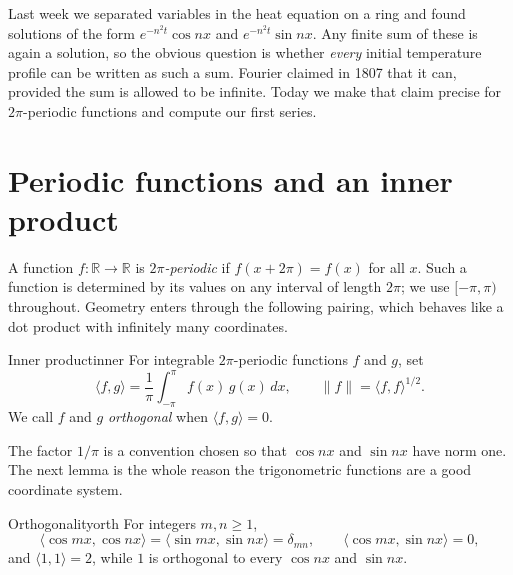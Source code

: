 \documentclass[11pt]{article}
\begin{document}

Last week we separated variables in the heat equation on a ring and found
solutions of the form $e^{-n^2 t}\cos nx$ and $e^{-n^2 t}\sin nx$. Any finite
sum of these is again a solution, so the obvious question is whether
\emph{every} initial temperature profile can be written as such a sum. Fourier
claimed in 1807 that it can, provided the sum is allowed to be
infinite. Today we make that claim precise for $2\pi$-periodic
functions and compute our first series.

\section{Periodic functions and an inner product}

A function $f\colon\mathbb{R}\to\mathbb{R}$ is \emph{$2\pi$-periodic} if
$f(x+2\pi)=f(x)$ for all $x$. Such a function is determined by its values on
any interval of length $2\pi$; we use $[-\pi,\pi)$ throughout. Geometry enters
through the following pairing, which behaves like a dot product with infinitely
many coordinates.

\begin{definition}{Inner product}{inner}
For integrable $2\pi$-periodic functions $f$ and $g$, set
\[
  \langle f,g\rangle = \frac{1}{\pi}\int_{-\pi}^{\pi} f(x)\,g(x)\,dx,
  \qquad \|f\| = \langle f,f\rangle^{1/2}.
\]
We call $f$ and $g$ \emph{orthogonal} when $\langle f,g\rangle=0$.
\end{definition}

The factor $1/\pi$ is a convention chosen so
that $\cos nx$ and $\sin nx$ have norm one. The next lemma is the whole reason
the trigonometric functions are a good coordinate system.

\begin{lemma}{Orthogonality}{orth}
For integers $m,n\ge 1$,
\[
  \langle \cos mx, \cos nx\rangle = \langle \sin mx, \sin nx\rangle
  = \delta_{mn},
  \qquad
  \langle \cos mx, \sin nx\rangle = 0,
\]
and $\langle 1, 1\rangle = 2$, while $1$ is orthogonal to every $\cos nx$ and
$\sin nx$.
\end{lemma}
\end{document}
